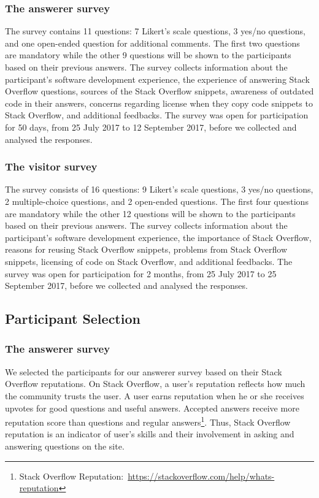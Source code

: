 \documentclass{svjour3}                     %
\begin{document}
\subsubsection{The answerer survey} 
The survey contains 11 questions: 7 Likert's
scale questions, 3 yes/no questions, and one open-ended question for additional
comments. The first two questions are mandatory while the other 9 questions will
be shown to the participants based on their previous answers. The survey
collects information about the participant's software development experience, the
experience of answering Stack Overflow questions, sources of the Stack Overflow
snippets, awareness of outdated code in their answers, concerns regarding
license when they copy code snippets to Stack Overflow, and additional
feedbacks. The survey was open for participation for 50 days, from 25 July 2017
to 12 September 2017, before we collected and analysed the responses.

\subsubsection{The visitor survey} 
The survey consists of 16 questions: 9 Likert's
scale questions, 3 yes/no questions, 2 multiple-choice questions, and 2
open-ended questions. The first four questions are mandatory while the other 12
questions will be shown to the participants based on their previous answers. The
survey collects information about the participant's software development
experience, the importance of Stack Overflow, reasons for reusing Stack Overflow
snippets, problems from Stack Overflow snippets, licensing of code on Stack
Overflow, and additional feedbacks. The survey was open for participation for 2 months, 
from 25 July 2017 to 25 September 2017, before we collected and analysed
the responses.

\subsection{Participant Selection}

\subsubsection{The answerer survey} 
We selected the participants for our answerer survey based on their Stack
Overflow reputations. On Stack Overflow, a user's reputation reflects how much
the community trusts the user. A user earns reputation when he or she receives
upvotes for good questions and useful answers. Accepted answers receive more
reputation score than questions and regular answers\footnote{Stack Overflow
	Reputation:~\url{https://stackoverflow.com/help/whats-reputation}}. Thus, Stack
Overflow reputation is an indicator of user's skills and their involvement in
asking and answering questions on the site.
\end{document}
